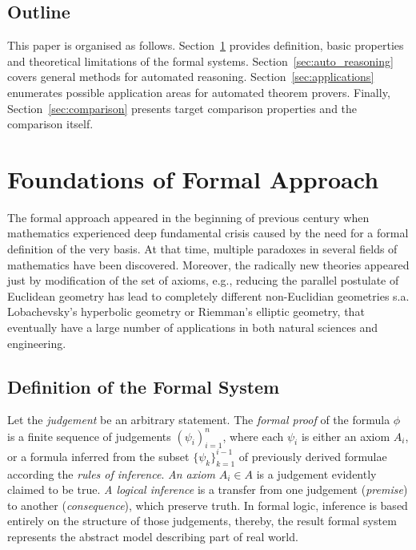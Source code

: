 \documentclass[article]{aaltoseries}
\begin{document}


\subsection{Outline}
This paper is organised as follows.
Section~\ref{sec:formal_theory} provides definition, basic properties and theoretical limitations of the formal systems. Section~\ref{sec:auto_reasoning} covers general methods for automated reasoning. Section~\ref{sec:applications} enumerates possible application areas for automated theorem provers. Finally, Section~\ref{sec:comparison} presents target comparison properties and the comparison itself.



\section{Foundations of Formal Approach}
\label{sec:formal_theory}

The formal approach appeared in the beginning of previous century when mathematics experienced deep fundamental crisis caused by the need for a formal definition of the very basis. At that time, multiple paradoxes in several fields of mathematics have been discovered. Moreover, the radically new theories appeared just by modification of the set of axioms, e.g., reducing the parallel postulate of Euclidean geometry has lead to completely different non-Euclidian geometries s.a. Lobachevsky's hyperbolic geometry or Riemman's elliptic geometry, that eventually have a large number of applications in both natural sciences and engineering.


\subsection{Definition of the Formal System}
\label{sec:definitions}


Let the \textit{judgement} be an arbitrary statement. The \textit{formal proof} of the formula $\phi$ is a finite sequence of judgements $ ( \psi_i )_{i=1}^{n} $, where each $\psi_i$ is either an axiom $A_i$, or a formula inferred from the subset $\{ \psi_k \}_{k=1}^{i-1}$ of previously derived formulae according the \textit{rules of inference}. \textit{An axiom} $A_i \in A$ is a judgement evidently claimed to be true. \textit{A logical inference} is a transfer from one judgement (\textit{premise}) to another (\textit{consequence}), which preserve truth. In formal logic, inference is based entirely on the structure of those judgements, thereby, the result formal system represents the abstract model describing part of real world. 
\end{document}
